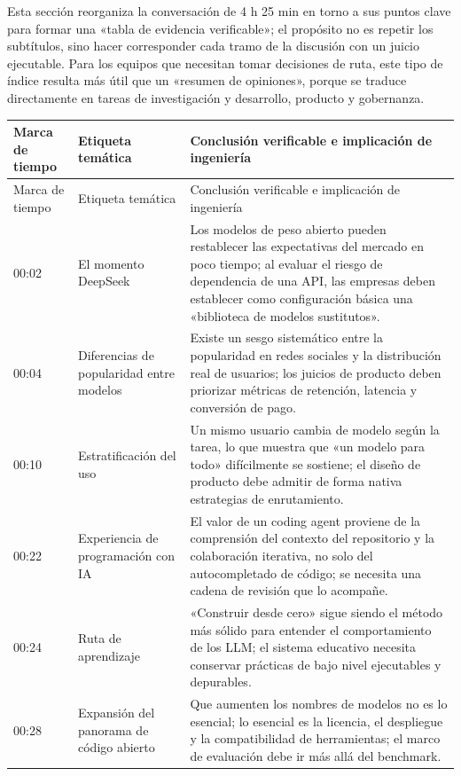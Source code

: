 \documentclass[a4paper]{article}
\begin{document}
Esta sección reorganiza la conversación de 4 h 25 min en torno a sus puntos clave para formar una «tabla de evidencia verificable»; el propósito no es repetir los subtítulos, sino hacer corresponder cada tramo de la discusión con un juicio ejecutable. Para los equipos que necesitan tomar decisiones de ruta, este tipo de índice resulta más útil que un «resumen de opiniones», porque se traduce directamente en tareas de investigación y desarrollo, producto y gobernanza.

\begin{longtable}{p{}p{}p{}}
\toprule
Marca de tiempo & Etiqueta temática & Conclusión verificable e implicación de ingeniería \\
\midrule
\endfirsthead
\toprule
Marca de tiempo & Etiqueta temática & Conclusión verificable e implicación de ingeniería \\
\midrule
\endhead
00:02 & El momento DeepSeek & Los modelos de peso abierto pueden restablecer las expectativas del mercado en poco tiempo; al evaluar el riesgo de dependencia de una API, las empresas deben establecer como configuración básica una «biblioteca de modelos sustitutos». \\
00:04 & Diferencias de popularidad entre modelos & Existe un sesgo sistemático entre la popularidad en redes sociales y la distribución real de usuarios; los juicios de producto deben priorizar métricas de retención, latencia y conversión de pago. \\
00:10 & Estratificación del uso & Un mismo usuario cambia de modelo según la tarea, lo que muestra que «un modelo para todo» difícilmente se sostiene; el diseño de producto debe admitir de forma nativa estrategias de enrutamiento. \\
00:22 & Experiencia de programación con IA & El valor de un coding agent proviene de la comprensión del contexto del repositorio y la colaboración iterativa, no solo del autocompletado de código; se necesita una cadena de revisión que lo acompañe. \\
00:24 & Ruta de aprendizaje & «Construir desde cero» sigue siendo el método más sólido para entender el comportamiento de los LLM; el sistema educativo necesita conservar prácticas de bajo nivel ejecutables y depurables. \\
00:28 & Expansión del panorama de código abierto & Que aumenten los nombres de modelos no es lo esencial; lo esencial es la licencia, el despliegue y la compatibilidad de herramientas; el marco de evaluación debe ir más allá del benchmark. \\

\end{longtable}
\end{document}

